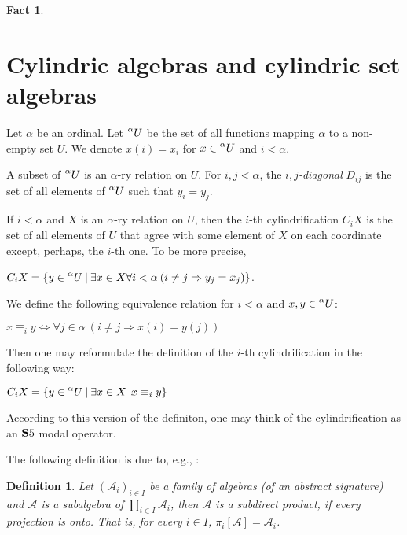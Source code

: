 \documentclass[a4paper]{article}
\theoremstyle{defin}
\newtheorem{defin}{Definition}
\theoremstyle{theorem}
\theoremstyle{prop}
\theoremstyle{lemma}
\theoremstyle{fact}
\newtheorem{fact}{Fact}
\theoremstyle{ex}
\theoremstyle{col}
\begin{document}
\begin{fact}
\end{fact}

\section{Cylindric algebras and cylindric set algebras}

 Let $\alpha$ be an ordinal. Let $\prescript{\alpha}{}U$ be the set of all functions mapping $\alpha$ to a non-empty set $U$. We denote $x(i) = x_i$ for
$x \in \prescript{\alpha}{}U$ and $i < \alpha$.

A subset of $\prescript{\alpha}{}U$ is an $\alpha$-ry relation on $U$. For $i, j < \alpha$, the \emph{$i,j$-diagonal} $D_{ij}$ is the set of all elements of $\prescript{\alpha}{}U$ such that $y_i = y_j$.

If $i < \alpha$ and $X$ is an $\alpha$-ry relation on $U$, then
the $i$-th cylindrification $C_i X$ is the set of all elements of $U$ that agree with some element of $X$ on each coordinate except, perhaps, the $i$-th one. To be more precise,
\begin{center}
$C_i X = \{ y \in \prescript{\alpha}{}U \: |
\: \exists x \in X \forall i < \alpha \: (i \neq j \Rightarrow y_j = x_j)\}$.
\end{center}
We define the following equivalence relation for $i < \alpha$ and $x, y \in \prescript{\alpha}{}U$:
\begin{center}
  $x \equiv_i y \Leftrightarrow \forall j \in \alpha \: (i \neq j \Rightarrow x(i) = y(j))$
\end{center}
Then one may reformulate the definition of the $i$-th cylindrification in the following way:

\begin{center}
  $C_i X = \{ y \in \prescript{\alpha}{}U \: | \: \exists x \in X \:\: x \equiv_i y \}$
\end{center}

According to this version of the definiton, one may think of the cylindrification as an ${\bf S}5$ modal operator.

The following definition is due to, e.g., \cite{sankappanavar1981course}:

\begin{defin}
  Let $(\mathcal{A}_i)_{i \in I}$ be a family of algebras (of an abstract signature) and $\mathcal{A}$ is a subalgebra of $\prod \limits_{i \in I} \mathcal{A}_i$, then $\mathcal{A}$ is a subdirect product, if every projection is onto. That is, for every $i \in I$, $\pi_i[\mathcal{A}] = \mathcal{A}_i$.
\end{defin}
\end{document}
